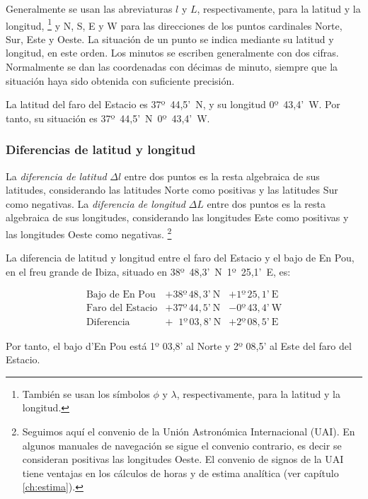 Generalmente se usan las abreviaturas $l$ y $L$, respectivamente, para la latitud y la longitud,%
\footnote{También se usan los símbolos $\phi$ y $\lambda$, respectivamente, para la latitud y la longitud.} 
 y N, S, E y W para las direcciones de los puntos cardinales Norte, Sur, Este y Oeste. La situación de un punto se indica mediante su latitud y longitud, en este orden. Los minutos se escriben generalmente con dos cifras. Normalmente se dan las coordenadas con décimas de minuto, siempre que la situación haya sido obtenida con suficiente precisión. 
 
 \begin{ejemplo}
La latitud del faro del Estacio es \mbox{37º 44,5’ N}, y su longitud \mbox{0º 43,4’ W}. 
Por tanto, su situación es \mbox{37º 44,5’ N 0º 43,4’ W.} 
\end{ejemplo}

\subsubsection{Diferencias de latitud y longitud}

 
La \emph{diferencia de latitud} $\Delta l$ entre dos puntos es la resta algebraica de sus latitudes, considerando las latitudes Norte como positivas y las latitudes Sur como negativas. La \emph{diferencia de longitud} $\Delta L$ entre dos puntos es la resta algebraica de sus longitudes, considerando las longitudes Este como positivas y las longitudes Oeste como negativas.%
\footnote{Seguimos aquí el convenio de la Unión Astronómica Internacional (UAI). En algunos manuales de navegación se sigue el convenio contrario, es decir se consideran positivas las longitudes Oeste. El convenio de signos de la UAI tiene ventajas en los cálculos de horas y de estima analítica (ver capítulo \ref{ch:estima}).}

\begin{ejemplo}
La diferencia de latitud y longitud entre el faro del Estacio  y el bajo de En Pou, en el freu grande de Ibiza, situado en
\mbox{38º 48,3' N 1º 25,1' E},  es: 

\[
\begin{array}{lll}
\mbox{Bajo de En Pou}       & +38º \, 48,3’ \:  \mathrm{N}   &   +1º \, 25,1’ \: \mathrm{E}  \\
\mbox{Faro del Estacio}      & +37º \, 44,5’  \: \mathrm{N}   &   -0º  \,43,4’   \:  \mathrm{W}  \\
\hline
 \mbox{Diferencia}               & + \;\;1º  \, 03,8’ \: \mathrm{N}   &    +2º \, 08,5’  \: \mathrm{E} 
\end{array}
\]

Por tanto, el bajo d’En Pou está 1º 03,8’ al Norte y 2º 08,5’ al Este del faro del Estacio. 
\end{ejemplo}

